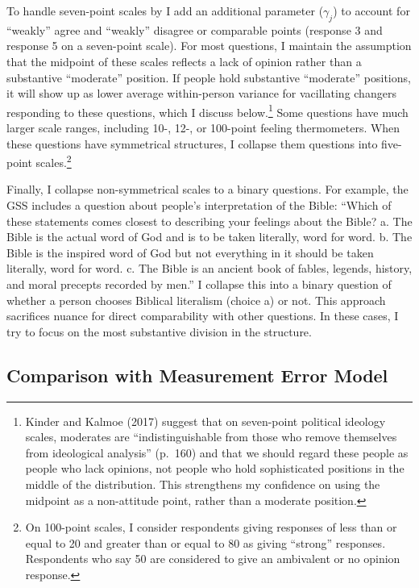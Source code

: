 \documentclass[12pt,]{article}
\begin{document}
To handle seven-point scales by I add an additional parameter (\(\gamma_j\)) to account for ``weakly'' agree and ``weakly'' disagree or comparable points (response 3 and response 5 on a seven-point scale). For most questions, I maintain the assumption that the midpoint of these scales reflects a lack of opinion rather than a substantive ``moderate'' position. If people hold substantive ``moderate'' positions, it will show up as lower average within-person variance for vacillating changers responding to these questions, which I discuss below.\footnote{Kinder and Kalmoe (2017) suggest that on seven-point political ideology scales, moderates are ``indistinguishable from those who remove themselves from ideological analysis'' (p.~160) and that we should regard these people as people who lack opinions, not people who hold sophisticated positions in the middle of the distribution. This strengthens my confidence on using the midpoint as a non-attitude point, rather than a moderate position.} Some questions have much larger scale ranges, including 10-, 12-, or 100-point feeling thermometers. When these questions have symmetrical structures, I collapse them questions into five-point scales.\footnote{On 100-point scales, I consider respondents giving responses of less than or equal to 20 and greater than or equal to 80 as giving ``strong'' responses. Respondents who say 50 are considered to give an ambivalent or no opinion response.}

Finally, I collapse non-symmetrical scales to a binary questions. For example, the GSS includes a question about people's interpretation of the Bible: ``Which of these statements comes closest to describing your feelings about the Bible? a. The Bible is the actual word of God and is to be taken literally, word for word. b. The Bible is the inspired word of God but not everything in it should be taken literally, word for word. c. The Bible is an ancient book of fables, legends, history, and moral precepts recorded by men.'' I collapse this into a binary question of whether a person chooses Biblical literalism (choice a) or not. This approach sacrifices nuance for direct comparability with other questions. In these cases, I try to focus on the most substantive division in the structure.

\hypertarget{comparison-with-measurement-error-model}{%
\subsection{Comparison with Measurement Error Model}\label{comparison-with-measurement-error-model}}
\end{document}

